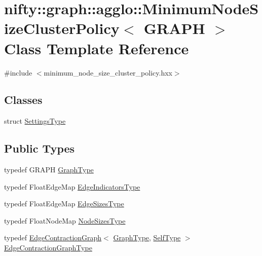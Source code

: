 \hypertarget{classnifty_1_1graph_1_1agglo_1_1MinimumNodeSizeClusterPolicy}{}\section{nifty\+:\+:graph\+:\+:agglo\+:\+:Minimum\+Node\+Size\+Cluster\+Policy$<$ G\+R\+A\+PH $>$ Class Template Reference}
\label{classnifty_1_1graph_1_1agglo_1_1MinimumNodeSizeClusterPolicy}


{\ttfamily \#include $<$minimum\+\_\+node\+\_\+size\+\_\+cluster\+\_\+policy.\+hxx$>$}

\subsection*{Classes}
\begin{DoxyCompactItemize}
\item 
struct \hyperlink{structnifty_1_1graph_1_1agglo_1_1MinimumNodeSizeClusterPolicy_1_1SettingsType}{Settings\+Type}
\end{DoxyCompactItemize}
\subsection*{Public Types}
\begin{DoxyCompactItemize}
\item 
typedef G\+R\+A\+PH \hyperlink{classnifty_1_1graph_1_1agglo_1_1MinimumNodeSizeClusterPolicy_a6d81a64ca67c9feec052a031552282f0}{Graph\+Type}
\item 
typedef Float\+Edge\+Map \hyperlink{classnifty_1_1graph_1_1agglo_1_1MinimumNodeSizeClusterPolicy_a81a0b54e4eadb98c9a125593b1c6e17c}{Edge\+Indicators\+Type}
\item 
typedef Float\+Edge\+Map \hyperlink{classnifty_1_1graph_1_1agglo_1_1MinimumNodeSizeClusterPolicy_a645ba7b5aabb0fd8cecad292041d929a}{Edge\+Sizes\+Type}
\item 
typedef Float\+Node\+Map \hyperlink{classnifty_1_1graph_1_1agglo_1_1MinimumNodeSizeClusterPolicy_a64f036ec68ecf74d84f9238f77957c1e}{Node\+Sizes\+Type}
\item 
typedef \hyperlink{classnifty_1_1graph_1_1EdgeContractionGraph}{Edge\+Contraction\+Graph}$<$ \hyperlink{classnifty_1_1graph_1_1agglo_1_1MinimumNodeSizeClusterPolicy_a6d81a64ca67c9feec052a031552282f0}{Graph\+Type}, \hyperlink{classnifty_1_1graph_1_1agglo_1_1MinimumNodeSizeClusterPolicy}{Self\+Type} $>$ \hyperlink{classnifty_1_1graph_1_1agglo_1_1MinimumNodeSizeClusterPolicy_a5c67401c61d1d283b73c3ce8a31faeb9}{Edge\+Contraction\+Graph\+Type}
\end{DoxyCompactItemize}
